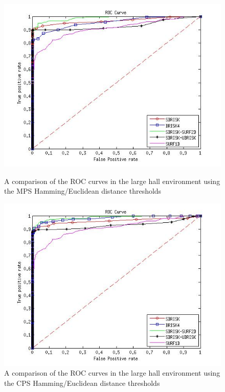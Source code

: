 \documentclass{article}
\begin{document}
\begin{figure}[h!]
\begin{minipage}[b]{0.5\linewidth}
\includegraphics[scale=0.4]{../Drawings/dataset3_ROC_General_Hamming.jpg}
\caption{A comparison of the ROC curves in the large hall environment using the MPS Hamming/Euclidean distance thresholds}
\label{fig:compareHammingOffice3}
\end{minipage}
\hspace{0.5cm}
\begin{minipage}[b]{0.5\linewidth}
\includegraphics[scale=0.4]{../Drawings/dataset3_ROC_General_Hamming_Consistent.jpg}
\caption{A comparison of the ROC curves in the large hall environment using the CPS Hamming/Euclidean distance thresholds}
\label{fig:compareHammingConsistentOffice3}
\end{minipage}
\end{figure}
\end{document}

